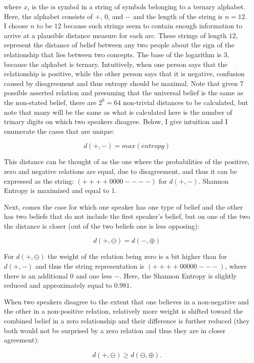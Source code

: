 \documentclass[12pt]{article}
\begin{document}
where $x_i$ is the $i$s symbol in a string of symbols belonging to a ternary alphabet. Here, the alphabet consists of $+$, $0$, and $-$ and the length of the string is $n=12$. I choose $n$ to be $12$ because such strings seem to contain enough information to arrive at a plausible distance measure for each arc. These strings of length $12$, represent the distance of belief between any two people about the sign of the relationship that lies between two concepts. The base of the logarithm is $3$, because the alphabet is ternary. Intuitively, when one person says that the relationship is positive, while the other person says that it is negative, confusion caused by disagreement and thus entropy should be maximal. Note that given 7 possible asserted relation and presuming that the universal belief is the same as the non-stated belief, there are $2^6=64$ non-trivial distances to be calculated, but note that many will be the same as what is calculated here is the number of trinary digits on which two speakers disagree. Below, I give intuition and I enumerate the cases that are unique:           

$$d(+, -) = max(entropy)$$

This distance can be thought of as the one where the probabilities of the positive, zero and negative relations are equal, due to disagreement, and thus it can be expressed as the string: $(++++0000----)$ for $d(+, -)$. Shannon Entropy is maximized and equal to $1$. 

Next, comes the case for which one speaker has one type of belief and the other has two beliefs that do not include the first speaker's belief, but on one of the two the distance is closer (out of the two beliefs one is less opposing):

$$d(+, \ominus)=d(-, \oplus)$$

For $d(+, \ominus)$ the weight of the relation being zero is a bit higher than for $d(+, -)$ and thus the string representation is $(++++00000---)$, where there is an additional $0$ and one less $-$. Here, the Shannon Entropy is slightly reduced and approximately equal to $0.981$.

When two speakers disagree to the extent that one believes in a non-negative and the other in a non-positive relation, relatively more weight is shifted toward the combined belief in a zero relationship and their difference is further reduced (they both would not be surprised by a zero relation and thus they are in closer agreement):

$$d(+, \ominus) \geq d(\ominus, \oplus).$$
\end{document}
